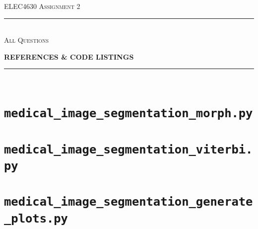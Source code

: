 \begin{titlepage}
  \centering

  \textsc{ELEC4630 Assignment 2}\\
  \vspace{9cm}

  \rule{\linewidth}{0.5pt}\\

  \vspace{1em}
  \LARGE\textsc{All Questions}\\
  \vspace{1em}

  \LARGE\uppercase{\textbf{{References \& Code Listings}}}\\

  \rule{\linewidth}{2pt}\\

  \vfill

\end{titlepage}

\printbibliography

\appendix

\newpage
\section{\texttt{medical\_image\_segmentation\_morph.py}}


\newpage
\section{\texttt{medical\_image\_segmentation\_viterbi.py}}


\newpage
\section{\texttt{medical\_image\_segmentation\_generate\_plots.py}}


% 

% 